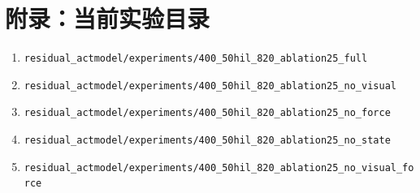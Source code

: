 \documentclass[UTF8,a4paper,11pt,fontset=none]{ctexart}
\begin{document}
\section*{附录：当前实验目录}
\begin{enumerate}
\item \texttt{residual\_actmodel/experiments/400\_50hil\_820\_ablation25\_full}
\item \texttt{residual\_actmodel/experiments/400\_50hil\_820\_ablation25\_no\_visual}
\item \texttt{residual\_actmodel/experiments/400\_50hil\_820\_ablation25\_no\_force}
\item \texttt{residual\_actmodel/experiments/400\_50hil\_820\_ablation25\_no\_state}
\item \texttt{residual\_actmodel/experiments/400\_50hil\_820\_ablation25\_no\_visual\_force}
\end{enumerate}
\end{document}
